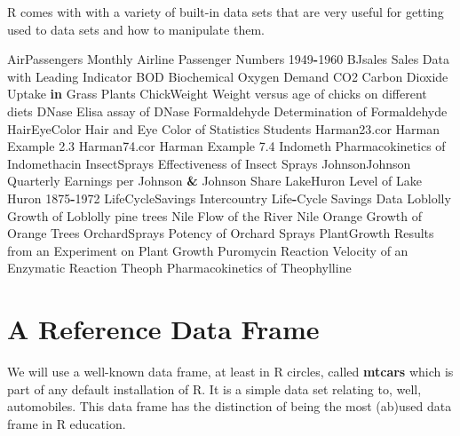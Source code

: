 \documentclass[]{book}
\newenvironment{Shaded}{\begin{snugshade}}{\end{snugshade}}
\newcommand{\DecValTok}[1]{\textcolor[rgb]{0.00,0.00,0.81}{#1}}
\newcommand{\FloatTok}[1]{\textcolor[rgb]{0.00,0.00,0.81}{#1}}
\newcommand{\StringTok}[1]{\textcolor[rgb]{0.31,0.60,0.02}{#1}}
\newcommand{\ControlFlowTok}[1]{\textcolor[rgb]{0.13,0.29,0.53}{\textbf{#1}}}
\newcommand{\OperatorTok}[1]{\textcolor[rgb]{0.81,0.36,0.00}{\textbf{#1}}}
\newcommand{\NormalTok}[1]{#1}
\begin{document}
R comes with with a variety of built-in data sets that are very useful
for getting used to data sets and how to manipulate them.

\begin{Shaded}
\begin{Highlighting}[]
\NormalTok{AirPassengers           Monthly Airline Passenger Numbers }\DecValTok{1949}\OperatorTok{-}\DecValTok{1960}
\NormalTok{BJsales                 Sales Data with Leading Indicator}
\NormalTok{BOD                     Biochemical Oxygen Demand}
\NormalTok{CO2                     Carbon Dioxide Uptake }\ControlFlowTok{in}\NormalTok{ Grass Plants}
\NormalTok{ChickWeight             Weight versus age of chicks on different diets}
\NormalTok{DNase                   Elisa assay of DNase}
\NormalTok{Formaldehyde            Determination of Formaldehyde}
\NormalTok{HairEyeColor            Hair and Eye Color of Statistics Students}
\NormalTok{Harman23.cor            Harman Example }\FloatTok{2.3}
\NormalTok{Harman74.cor            Harman Example }\FloatTok{7.4}
\NormalTok{Indometh                Pharmacokinetics of Indomethacin}
\NormalTok{InsectSprays            Effectiveness of Insect Sprays}
\NormalTok{JohnsonJohnson          Quarterly Earnings per Johnson }\OperatorTok{&}\StringTok{ }\NormalTok{Johnson Share}
\NormalTok{LakeHuron               Level of Lake Huron }\DecValTok{1875}\OperatorTok{-}\DecValTok{1972}
\NormalTok{LifeCycleSavings        Intercountry Life}\OperatorTok{-}\NormalTok{Cycle Savings Data}
\NormalTok{Loblolly                Growth of Loblolly pine trees}
\NormalTok{Nile                    Flow of the River Nile}
\NormalTok{Orange                  Growth of Orange Trees}
\NormalTok{OrchardSprays           Potency of Orchard Sprays}
\NormalTok{PlantGrowth             Results from an Experiment on Plant Growth}
\NormalTok{Puromycin               Reaction Velocity of an Enzymatic Reaction}
\NormalTok{Theoph                  Pharmacokinetics of Theophylline}
\end{Highlighting}
\end{Shaded}

\section{A Reference Data Frame}\label{a-reference-data-frame}

We will use a well-known data frame, at least in R circles, called
\textbf{mtcars} which is part of any default installation of R. It is a
simple data set relating to, well, automobiles. This data frame has the
distinction of being the most (ab)used data frame in R education.
\end{document}
